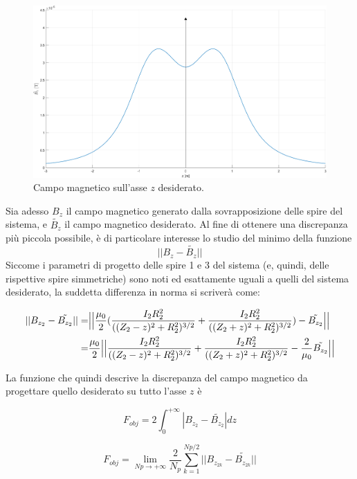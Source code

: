 \documentclass[a4paper, 11pt]{article}
\begin{document}
\begin{figure}[H]
    \centering
    \includegraphics[width=16cm]{assets/figure2}
    \caption{Campo magnetico sull'asse $z$ desiderato.}
\end{figure}
\noindent
Sia adesso $B_{z}$ il campo magnetico generato dalla sovrapposizione delle spire
del sistema, e $\tilde{B_{z}}$ il campo magnetico desiderato. Al fine di
ottenere una discrepanza più piccola possibile, è di particolare interesse lo
studio del minimo della funzione
\[||B_{z}-\tilde{B_{z}}||\] Siccome i parametri di progetto delle spire 1 e 3
del sistema (e, quindi, delle rispettive spire simmetriche) sono noti ed
esattamente uguali a quelli del sistema desiderato, la suddetta differenza in
norma si scriverà come:

\begin{equation}
    \begin{split}
        ||B_{z_{2}}-\tilde{B_{z_{2}}}||
        =& \Bigl|\Bigl|\frac{\mu_{0}}{2}(\frac{I_{2}R_{2}^{2}}{((Z_{2}-z)^{2}+R_{2}^{2})^{3/2}}+\frac{I_{2}R_{2}^{2}}{((Z_{2}+z)^{2}+R_{2}^{2})^{3/2}})-\tilde{B_{z_{2}}}\Bigr|\Bigr| \\
        =& \frac{\mu_{0}}{2}\Bigl|\Bigl|\frac{I_{2}R_{2}^{2}}{((Z_{2}-z)^{2}+R_{2}^{2})^{3/2}}+\frac{I_{2}R_{2}^{2}}{((Z_{2}+z)^{2}+R_{2}^{2})^{3/2}}-\frac{2}{\mu_{0}}\tilde{B_{z_{2}}}\Bigr|\Bigr|
    \end{split} 
\end{equation}

\noindent
La funzione che quindi descrive la discrepanza del campo magnetico da
progettare quello desiderato su tutto l'asse $z$ è 

\[F_{obj}=2\int_{0}^{+\infty}|B_{z_{2}}-\tilde{B_{z_{2}}}|dz\]

\[F_{obj}=\lim_{Np \rightarrow + \infty}\frac{2}{N_{p}}\sum\limits_{k=1}^{Np/2} ||B_{z_{2k}}-\tilde{B_{z_{2k}}}||\]
\end{document}
